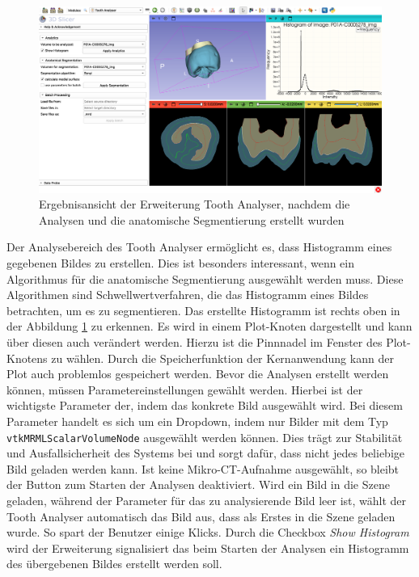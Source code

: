 \begin{figure}[h]
	\centering
	\includegraphics[width=\textwidth]{img/toothAnalyserFullView.png}
	\caption{Ergebnisansicht der Erweiterung Tooth Analyser, nachdem die Analysen und
	die anatomische Segmentierung erstellt wurden}
	\label{fig:tooth_analyser_full_view}
\end{figure}

Der Analysebereich des Tooth Analyser ermöglicht es, dass Histogramm eines
gegebenen Bildes zu erstellen. Dies ist besonders interessant, wenn ein
Algorithmus für die anatomische Segmentierung ausgewählt werden muss. Diese Algorithmen
sind Schwellwertverfahren, die das Histogramm eines Bildes betrachten, um es zu segmentieren.
Das erstellte Histogramm ist rechts oben in der Abbildung
\ref{fig:tooth_analyser_full_view} zu erkennen. Es wird in einem Plot-Knoten dargestellt
und kann über diesen auch verändert werden. Hierzu ist die Pinnnadel im Fenster
des Plot-Knotens zu wählen. Durch die Speicherfunktion der Kernanwendung kann der
Plot auch problemlos gespeichert werden. Bevor die Analysen erstellt werden
können, müssen Parametereinstellungen gewählt werden. Hierbei ist der wichtigste
Parameter der, indem das konkrete Bild ausgewählt wird. Bei diesem Parameter
handelt es sich um ein Dropdown, indem nur Bilder mit dem Typ \texttt{vtkMRMLScalarVolumeNode}
ausgewählt werden können. Dies trägt zur Stabilität und Ausfallsicherheit des Systems
bei und sorgt dafür, dass nicht jedes beliebige Bild geladen werden kann. Ist keine
Mikro-\ac{CT}-Aufnahme ausgewählt, so bleibt der Button zum Starten der Analysen
deaktiviert. Wird ein Bild in die Szene geladen, während der Parameter für das zu
analysierende Bild leer ist, wählt der Tooth Analyser automatisch das Bild aus, dass
als Erstes in die Szene geladen wurde. So spart der Benutzer einige Klicks. Durch
die Checkbox \textit{Show Histogram} wird der Erweiterung signalisiert das beim
Starten der Analysen ein Histogramm des übergebenen Bildes erstellt werden soll.

